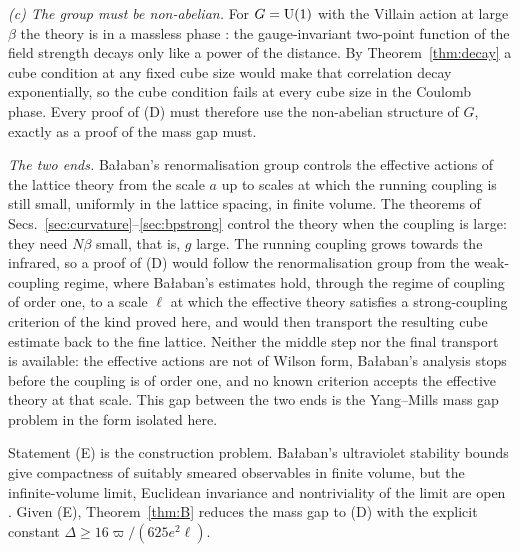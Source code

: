 \emph{(c) The group must be non-abelian.} For $G=\mathrm{U}(1)$ with the Villain
action at large $\beta$ the theory is in a massless phase \cite{FS82}: the
gauge-invariant two-point function of the field strength decays only like a
power of the distance. By Theorem~\ref{thm:decay} a cube condition at any
fixed cube size would make that correlation decay exponentially, so the cube
condition fails at every cube size in the Coulomb phase. Every proof of (D)
must therefore use the non-abelian structure of $G$, exactly as a proof of
the mass gap must.

\emph{The two ends.} Ba{\l}aban's renormalisation group
\cite{Bal84a,Bal85a,Bal89b} controls the effective actions of the lattice
theory from the scale $a$ up to scales at which the running coupling is still
small, uniformly in the lattice spacing, in finite volume. The theorems of
Secs.~\ref{sec:curvature}--\ref{sec:bpstrong} control the theory when the
coupling is large: they need $N\beta$ small, that is, $g$ large. The running
coupling grows towards the infrared, so a proof of (D) would follow the
renormalisation group from the weak-coupling regime, where Ba{\l}aban's
estimates hold, through the regime of coupling of order one, to a scale
$\ell$ at which the effective theory satisfies a strong-coupling criterion of
the kind proved here, and would then transport the resulting cube estimate
back to the fine lattice. Neither the middle step nor the final transport is
available: the effective actions are not of Wilson form, Ba{\l}aban's analysis
stops before the coupling is of order one, and no known criterion accepts the
effective theory at that scale. This gap between the two ends is the Yang--Mills
mass gap problem in the form isolated here.

Statement (E) is the construction problem. Ba{\l}aban's ultraviolet stability
bounds give compactness of suitably smeared observables in finite volume, but
the infinite-volume limit, Euclidean invariance and nontriviality of the limit
are open \cite{JW06}. Given (E), Theorem~\ref{thm:B} reduces the mass gap to
(D) with the explicit constant $\Delta\ge16\varpi/(625e^2\ell)$.

